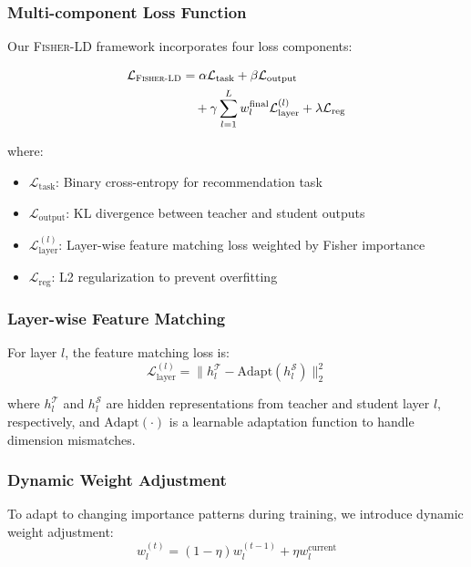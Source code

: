 \documentclass[10pt,conference]{IEEEtran}
\newcommand{\loss}{\mathcal{L}}
\newcommand{\student}{\mathcal{S}}
\newcommand{\teacher}{\mathcal{T}}
\newcommand{\fisherld}{\textsc{Fisher-LD}}
\begin{document}
\subsubsection{Multi-component Loss Function}

Our \fisherld{} framework incorporates four loss components:

\begin{align}
\loss_{\fisherld} &= \alpha \loss_{\text{task}} + \beta \loss_{\text{output}} \nonumber \\
&\quad + \gamma \sum_{l=1}^L w_l^{\text{final}} \loss_{\text{layer}}^{(l)} + \lambda \loss_{\text{reg}}
\end{align}

where:
\begin{itemize}[leftmargin=*]
    \item $\loss_{\text{task}}$: Binary cross-entropy for recommendation task
    \item $\loss_{\text{output}}$: KL divergence between teacher and student outputs
    \item $\loss_{\text{layer}}^{(l)}$: Layer-wise feature matching loss weighted by Fisher importance
    \item $\loss_{\text{reg}}$: L2 regularization to prevent overfitting
\end{itemize}

\subsubsection{Layer-wise Feature Matching}

For layer $l$, the feature matching loss is:
\begin{equation}
\loss_{\text{layer}}^{(l)} = \|h_l^{\teacher} - \text{Adapt}(h_l^{\student})\|_2^2
\end{equation}

where $h_l^{\teacher}$ and $h_l^{\student}$ are hidden representations from teacher and student layer $l$, respectively, and $\text{Adapt}(\cdot)$ is a learnable adaptation function to handle dimension mismatches.

\subsubsection{Dynamic Weight Adjustment}

To adapt to changing importance patterns during training, we introduce dynamic weight adjustment:
\begin{equation}
w_l^{(t)} = (1-\eta) w_l^{(t-1)} + \eta w_l^{\text{current}}
\end{equation}
\end{document}
